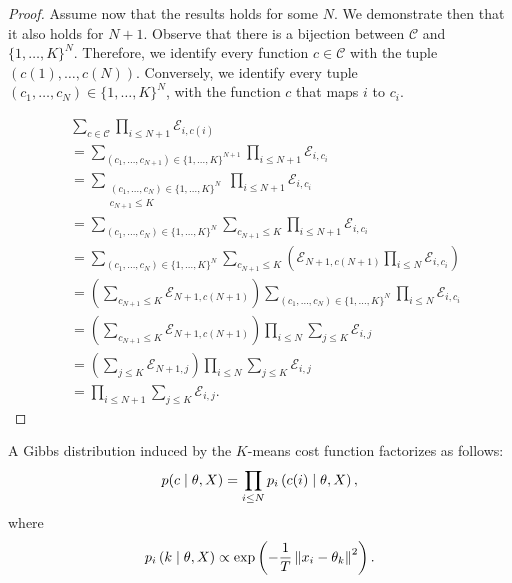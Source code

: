 \begin{proof}
Assume now that the results holds for some $N$. We demonstrate then that it also holds for $N + 1$. Observe that there is a bijection between $\mathcal{C}$ and $\{1, \ldots, K\}^N$. Therefore, we identify every function $c \in \mathcal{C}$ with the tuple $\left(c(1), \ldots, c(N)\right)$. Conversely, we identify every tuple $\left(c_1, \ldots, c_N\right) \in \{1, \ldots, K\}^N$, with the function $c$ that maps $i$ to $c_i$.

%
\begin{align}
&\sum_{c \in \mathcal{C}} \prod_{i \leq N + 1} \mathcal{E}_{i, c(i)}\\
&=\sum_{\left(c_1, \ldots, c_{N+1}\right) \in \{1, \ldots, K\}^{N+1}} \prod_{i \leq N + 1} \mathcal{E}_{i, c_i}\\
&=\sum_{\substack{\left(c_1, \ldots, c_{N}\right) \in \{1, \ldots, K\}^{N}\\
c_{N+1} \leq K
}} \prod_{i \leq N + 1} \mathcal{E}_{i, c_i}\\
&=\sum_{\left(c_1, \ldots, c_{N}\right) \in \{1, \ldots, K\}^{N}} \sum_{c_{N+1} \leq K}\prod_{i \leq N + 1} \mathcal{E}_{i, c_i}\\
&=\sum_{\left(c_1, \ldots, c_{N}\right) \in \{1, \ldots, K\}^{N}} \sum_{c_{N+1} \leq K}\left(\mathcal{E}_{N+1, c(N+1)}\prod_{i \leq N} \mathcal{E}_{i, c_i}\right)\\
&=\left(\sum_{c_{N+1} \leq K}\mathcal{E}_{N+1, c(N+1)}\right) \sum_{\left(c_1, \ldots, c_{N}\right) \in \{1, \ldots, K\}^{N}} \prod_{i \leq N} \mathcal{E}_{i, c_i}\\
&=\left(\sum_{c_{N+1} \leq K}\mathcal{E}_{N+1, c(N+1)} \right)\prod_{i \leq N} \sum_{j \leq K}\mathcal{E}_{i, j}\\
&=\left(\sum_{j \leq K}\mathcal{E}_{N+1, j} \right)\prod_{i \leq N} \sum_{j \leq K}\mathcal{E}_{i, j}\\
&= \prod_{i \leq N+1} \sum_{j \leq K}\mathcal{E}_{i, j}.
\end{align}
%
\end{proof}

\begin{theorem}
A Gibbs distribution induced by the $K$-means cost function
factorizes as follows:
%
\begin{equation}
p(c \mid \theta, X) = \prod_{i \leq N} p_{i} \left(c(i)\mid \theta, X\right),
\label{eq:gibbs_distr_factorizes}
\end{equation}
%
where
%
\begin{equation}
p_{i} \left(k\mid \theta, X\right) \propto \exp\left(-\frac{1}{T}\left\|x_i - \theta_{k}\right\|^2\right).
\label{eq:gibbs_factors_da}
\end{equation}
%
\label{thm:gibbs_factorizes}
\end{theorem}

